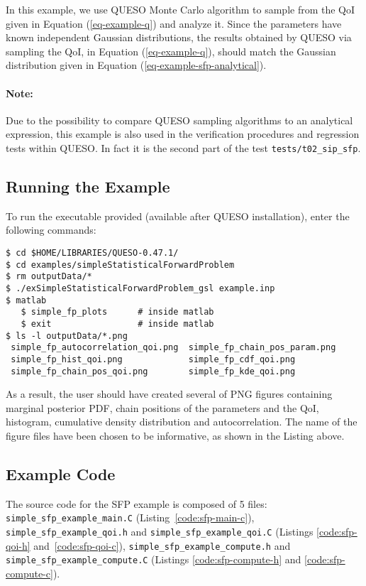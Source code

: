 In this example, we use QUESO Monte Carlo algorithm to sample from the QoI given in Equation (\ref{eq-example-q}) and analyze it. 
Since the parameters have known independent Gaussian distributions, the results obtained by QUESO via sampling the QoI, in Equation (\ref{eq-example-q}), should match the Gaussian distribution given in Equation (\ref{eq-example-sfp-analytical}).


\paragraph*{Note:} Due to the possibility to compare QUESO sampling algorithms to an analytical expression, this example is also used in the verification procedures and regression tests within QUESO. In fact it is the second part of the test \verb+tests/t02_sip_sfp+.


\subsection{Running the Example}\label{sec:sfp-run}
 
To run the executable provided (available after QUESO installation), enter the following commands:
\begin{lstlisting}[label={},caption={}]
$ cd $HOME/LIBRARIES/QUESO-0.47.1/
$ cd examples/simpleStatisticalForwardProblem
$ rm outputData/*
$ ./exSimpleStatisticalForwardProblem_gsl example.inp    
$ matlab
   $ simple_fp_plots      # inside matlab
   $ exit                 # inside matlab
$ ls -l outputData/*.png
 simple_fp_autocorrelation_qoi.png  simple_fp_chain_pos_param.png  
 simple_fp_hist_qoi.png             simple_fp_cdf_qoi.png
 simple_fp_chain_pos_qoi.png        simple_fp_kde_qoi.png
\end{lstlisting}

As a result, the user should have created several of PNG figures containing marginal posterior PDF, chain positions of the parameters and the QoI, histogram, cumulative density distribution and autocorrelation. The name of the figure files have been chosen to be informative, as shown in the Listing above.



\subsection{Example Code}\label{sec:code-sfp}

The source code for the SFP example is composed of 5 files:
\texttt{simple\_sfp\_example\_main.C} (Listing~\ref{code:sfp-main-c}),
\texttt{simple\_sfp\_example\_qoi.h} and \texttt{simple\_sfp\_example\_qoi.C} (Listings \ref{code:sfp-qoi-h} and~\ref{code:sfp-qoi-c}),
\texttt{simple\_sfp\_example\_compute.h}  and \texttt{simple\_sfp\_example\_compute.C} (Listings \ref{code:sfp-compute-h} and \ref{code:sfp-compute-c}).



